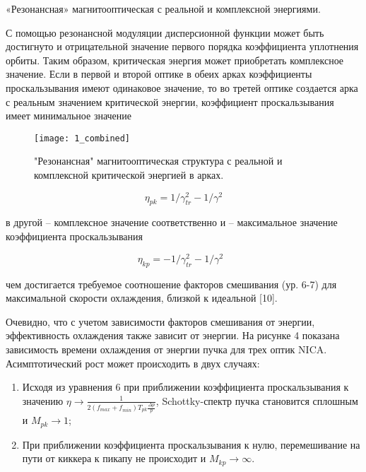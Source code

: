 \par «Резонансная» магнитооптическая с реальной и комплексной энергиями.
 \par С помощью резонансной модуляции дисперсионной функции может быть достигнуто и отрицательной значение первого порядка коэффициента уплотнения орбиты. Таким образом, критическая энергия может приобретать комплексное значение.  Если в первой и второй оптике в обеих арках коэффициенты проскальзывания имеют одинаковое значение, то во третей оптике создается арка с реальным значением критической энергии, коэффициент проскальзывания имеет минимальное значение

\begin{figure}[!h]
  \centering
   \texttt{[image: 1\_combined]}
   \caption{"Резонансная" магнитооптическая структура с реальной и комплексной критической энергией в арках.}
   \label{fig:1_combined}
\end{figure}

\begin{equation}
\eta_{pk}=1/\gamma_{tr}^2-1/\gamma^2
\end{equation}

в другой – комплексное значение соответственно и – максимальное значение коэффициента проскальзывания

\begin{equation}
\eta_{kp}=-1/\gamma_{tr}^2-1/\gamma^2\ \ \ 
\end{equation}

чем достигается требуемое соотношение факторов смешивания (ур. 6-7) для максимальной скорости охлаждения, близкой к идеальной [10].

Очевидно, что с учетом зависимости факторов смешивания от энергии, эффективность охлаждения также зависит от энергии. На рисунке 4 показана зависимость времени охлаждения от энергии пучка для трех оптик NICA. Асимптотический рост может происходить в двух случаях:

\begin{enumerate}
\item Исходя из уравнения 6 при приближении коэффициента проскальзывания к значению $\eta\rightarrow\frac{1}{2\left(f_{max}+f_{min}\right)T_{pk}\frac{\Delta p}{p}}$, Schottky-спектр пучка становится сплошным и $M_{pk}\rightarrow1$;
\item При приближении коэффициента проскальзывания к нулю, перемешивание на пути от киккера к пикапу не происходит и $M_{kp}\rightarrow\infty$.
\end{enumerate}

